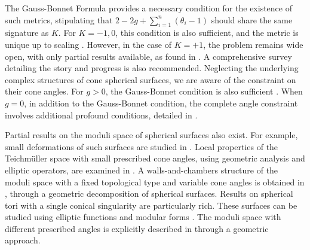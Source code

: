 \documentclass[pdflatex,sn-mathphys]{sn-jnl}%
\numberwithin{equation}{section}
\theoremstyle{thmstyleone}%
\begin{document}
The Gauss-Bonnet Formula provides a necessary condition for the existence of such metrics, stipulating that \(2 - 2g + \sum_{i=1}^n (\theta_i - 1)\) should share the same signature as \(K\). For \(K = -1, 0\), this condition is also sufficient, and the metric is unique up to scaling \cite{Heins62, McO88, Tro91}. However, in the case of \(K = +1\), the problem remains wide open, with only partial results available, as found in \cite{Tro89, Tro91, LuoT92, UYa00, Erm04, LinWang10, BDMM11, EGT14, EG15, Erm20sph, LSX21, dBP22}. A comprehensive survey \cite{Erm21arxiv} detailing the story and progress is also recommended. Neglecting the underlying complex structures of cone spherical surfaces, we are aware of the constraint on their cone angles. For \(g > 0\), the Gauss-Bonnet condition is also sufficient \cite{MonPa19}. When \(g = 0\), in addition to the Gauss-Bonnet condition, the complete angle constraint involves additional profound conditions, detailed in \cite{MonPa16, Li19, Erm20}.

Partial results on the moduli space of spherical surfaces also exist. For example, small deformations of such surfaces are studied in \cite{MzZhu20, MzZhu22}. Local properties of the Teichm\"uller space with small prescribed cone angles, using geometric analysis and elliptic operators, are examined in \cite{MzWs17}. A walls-and-chambers structure of the moduli space with a fixed topological type and variable cone angles is obtained in \cite{Tah22}, through a geometric decomposition of spherical surfaces.
Results on spherical tori with a single conical singularity are particularly rich. These surfaces can be studied using elliptic functions and modular forms \cite{LinWang10, ChLinW15, ChKLin17, LinW17}. The moduli space with different prescribed angles is explicitly described in \cite{EMP20} through a geometric approach.

\end{document}
